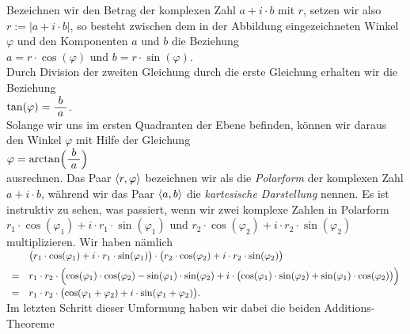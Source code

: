 \vspace*{0.2cm}
\noindent
Bezeichnen wir den Betrag der komplexen Zahl $a + i \cdot b$ mit $r$, setzen wir also 
$r := |a + i \cdot b|$, so besteht zwischen dem in der Abbildung eingezeichneten Winkel $\varphi$
und den Komponenten $a$ und 
$b$ die Beziehung
\\[0.2cm]
\hspace*{1.3cm} $a = r \cdot \cos(\varphi)$ \quad und \quad $b = r \cdot \sin(\varphi)$.
\\[0.2cm]
Durch Division der zweiten Gleichung durch die erste Gleichung erhalten wir die Beziehung
\\[0.2cm]
\hspace*{1.3cm} $\tan(\varphi) = \bruch{b}{a}$.
\\[0.2cm]
Solange wir uns im ersten Quadranten der Ebene befinden, k\"{o}nnen wir daraus den Winkel $\varphi$ mit Hilfe
der Gleichung
\\[0.2cm]
\hspace*{1.3cm} $\varphi = \arctan\Bigl(\bruch{b}{a}\Bigr)$
\\[0.2cm]
ausrechnen.  Das Paar $\pair(r, \varphi)$ bezeichnen wir als die \emph{Polarform} der
komplexen Zahl $a + i \cdot b$, w\"{a}hrend wir das Paar $\pair(a,b)$ die \emph{kartesische Darstellung}
nennen.  Es ist instruktiv zu sehen, was passiert, wenn wir zwei
komplexe Zahlen in Polarform
\\[0.2cm]
\hspace*{1.3cm} 
$r_1 \cdot \cos(\varphi_1) + i \cdot r_1 \cdot \sin(\varphi_1)$ \quad und \quad
$r_2 \cdot \cos(\varphi_2) + i \cdot r_2 \cdot \sin(\varphi_2)$ 
\\[0.2cm]
multiplizieren.  Wir haben n\"{a}mlich
\\[0.2cm]
$
\begin{array}[t]{cl}
  & \bigl(r_1 \cdot \cos(\varphi_1) + i \cdot r_1 \cdot \sin(\varphi_1)\bigr) \cdot
    \bigl(r_2 \cdot \cos(\varphi_2) + i \cdot r_2 \cdot \sin(\varphi_2)\bigr)       \\[0.2cm]
= & r_1 \cdot r_2 \cdot
    \Bigl(\cos(\varphi_1) \cdot \cos(\varphi_2) - \sin(\varphi_1) \cdot \sin(\varphi_2) +
          i \cdot \bigl(\cos(\varphi_1) \cdot \sin(\varphi_2) + \sin(\varphi_1) \cdot \cos(\varphi_2)\bigr)
    \Bigr) \\[0.2cm]
= & r_1 \cdot r_2 \cdot
    \bigl(\cos(\varphi_1 + \varphi_2) + i \cdot \sin(\varphi_1 + \varphi_2) \bigr).
\end{array}
$
\\[0.2cm]
Im letzten Schritt dieser Umformung haben wir dabei die beiden Additions-Theoreme 
